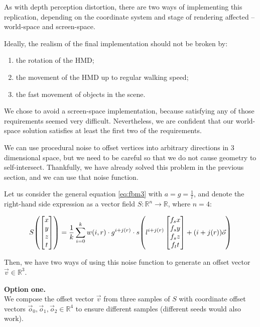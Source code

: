 As with depth perception distortion, there are two ways of implementing this replication, depending on the coordinate system and stage of rendering affected -- world-space and screen-space.

Ideally, the realism of the final implementation should not be broken by:

\begin{enumerate}
    \item the rotation of the \ac{HMD};
    \item the movement of the \ac{HMD} up to regular walking speed;
    \item the fast movement of objects in the scene.
\end{enumerate}

We chose to avoid a screen-space implementation, because satisfying any of those requirements seemed very difficult. Nevertheless, we are confident that our world-space solution satisfies at least the first two of the requirements.

We can use procedural noise to offset vertices into arbitrary directions in 3 dimensional space, but we need to be careful so that we do not cause geometry to self-intersect. Thankfully, we have already solved this problem in the previous section, and we can use that noise function.

Let us consider the general equation \ref{eq:fbm3} with $a = g = \frac{1}{l}$, and denote the right-hand side expression as a vector field $S \colon \mathbb{R}^n \to \mathbb{R}$, where $n = 4$:

\begin{equation}
    S\mleft(\begin{bmatrix}x\\y\\z\\t\end{bmatrix}\mright) = \frac{1}{k} \sum_{i=0}^{k} w(i, r) \cdot g^{i+j(r)} \cdot s\mleft(l^{i+j(r)} \begin{bmatrix}f_sx\\f_sy\\f_sz\\f_tt\end{bmatrix} + (i + j(r)) \vec{o}\mright)
\end{equation}

Then, we have two ways of using this noise function to generate an offset vector $\vec{v} \in \mathbb{R}^3$.

\textbf{Option one.}\\We compose the offset vector $\vec{v}$ from three samples of $S$ with coordinate offset vectors $\vec{o}_{0}, \vec{o}_{1}, \vec{o}_{2} \in \mathbb{R}^4$ to ensure different samples (different seeds would also work).

